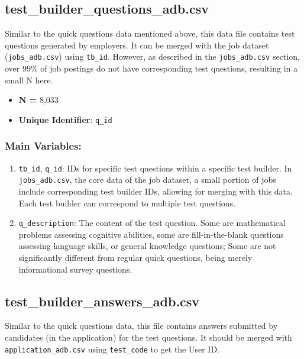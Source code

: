 \documentclass[12pt]{article}
\begin{document}
\subsection{test\_builder\_questions\_adb.csv}

Similar to the quick questions data mentioned above, this data file contains test questions generated by employers. It can be merged with the job dataset (\texttt{jobs\_adb.csv}) using \texttt{tb\_id}. However, as described in the \texttt{jobs\_adb.csv} section, over 99\% of job postings do not have corresponding test questions, resulting in a small N here.

\begin{itemize}
    \item \textbf{N = }8,033
    \item \textbf{Unique Identifier}: \texttt{q\_id}
    \end{itemize}
 \subsubsection*{Main Variables:}
    \begin{enumerate}
        \item \texttt{tb\_id}, \texttt{q\_id}: IDs for specific test questions within a specific test builder. In \texttt{jobs\_adb.csv}, the core data of the job dataset, a small portion of jobs include corresponding test builder IDs, allowing for merging with this data. Each test builder can correspond to multiple test questions.
        \item \texttt{q\_description}: The content of the test question. Some are mathematical problems assessing cognitive abilities, some are fill-in-the-blank questions assessing language skills, or general knowledge questions; Some are not significantly different from regular quick questions, being merely informational survey questions.
    \end{enumerate}






\subsection{test\_builder\_answers\_adb.csv}
Similar to the quick questions data, this file contains answers submitted by candidates (in the application) for the test questions. It should be merged with \texttt{application\_adb.csv} using \texttt{test\_code} to get the User ID.
\end{document}
